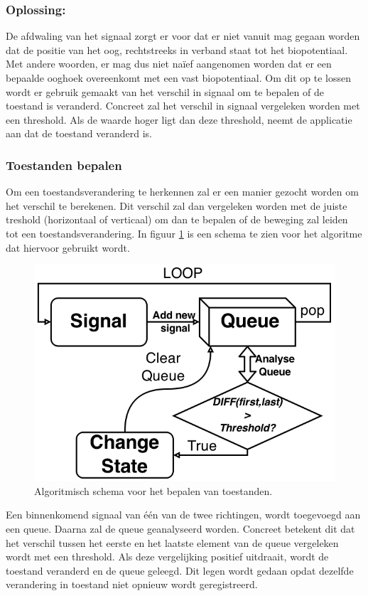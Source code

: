 \documentclass{article}
\newcommand{\figwidth}{0.85\linewidth}
\begin{document}
\subsubsection{Oplossing:}
De afdwaling van het signaal zorgt er voor dat er niet vanuit mag gegaan worden dat de positie van het oog, rechtstreeks in verband staat tot het biopotentiaal. Met andere woorden, er mag dus niet na\"ief aangenomen worden dat er een bepaalde ooghoek overeenkomt met een vast biopotentiaal. Om dit op te lossen wordt er gebruik gemaakt van het verschil in signaal om te bepalen of de toestand is veranderd. Concreet zal het verschil in signaal vergeleken worden met een threshold. Als de waarde hoger ligt dan deze threshold, neemt de applicatie aan dat de toestand veranderd is.\\


\subsubsection*{Toestanden bepalen}
Om een toestandsverandering te herkennen zal er een manier gezocht worden om het verschil te berekenen. Dit verschil zal dan vergeleken worden met de juiste treshold (horizontaal of verticaal) om dan te bepalen of de beweging zal leiden tot een toestandsverandering. In figuur \ref{fig:algostatefilter} is een schema te zien voor het algoritme dat hiervoor gebruikt wordt.
\begin{figure}[H]
	\centering
	\includegraphics[width=\figwidth]{images/StateFilter_bw}
	\caption{Algoritmisch schema voor het bepalen van toestanden.}
	\label{fig:algostatefilter}
\end{figure}
Een binnenkomend signaal van \'e\'en van de twee richtingen, wordt toegevoegd aan een queue. Daarna zal de queue geanalyseerd worden. Concreet betekent dit dat het verschil tussen het eerste en het laatste element van de queue vergeleken wordt met een threshold. Als deze vergelijking positief uitdraait, wordt de toestand veranderd en de queue geleegd. Dit legen wordt gedaan opdat dezelfde verandering in toestand niet opnieuw wordt geregistreerd.
\end{document}

